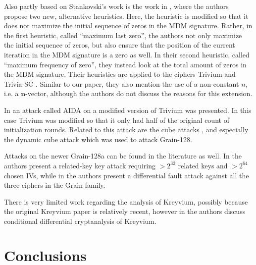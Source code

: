 { %
Also partly based on Stankovski's work is the work in \cite{sarkar:2016}, where the authors propose two new, alternative heuristics. Here, the heuristic is modified so that it does not maximize the initial sequence of zeros in the MDM signature. Rather, in the first heuristic, called ``maximum last zero'', the authors not only maximize the initial sequence of zeros, but also ensure that the position of the current iteration in the MDM signature is a zero as well. In their second heuristic, called ``maximum frequency of zero'', they instead look at the total amount of zeros in the MDM signature. Their heuristics are applied to the ciphers Trivium \cite{canniere:2006} and Trivia-SC \cite{chakraborti:2015}. Similar to our paper, they also mention the use of a non-constant $n$, i.e. a $\bm{n}$-vector, although the authors do not discuss the reasons for this extension.

In \cite{vielhaber:2007} an attack called AIDA on a modified version of Trivium was presented. In this case Trivium was modified so that it only had half of the original count of initialization rounds. Related to this attack are the 
cube attacks \cite{dinur:2009}, and especially the dynamic cube attack \cite{dinur:2011} which was used to attack Grain-128.

Attacks on the newer Grain-128a can be found in the literature as well. In \cite{banik:2013} the authors present a related-key key attack requiring $>2^{32}$ related keys and $>2^{64}$ chosen IVs, while in \cite{sarkar:2014} the authors present a differential fault attack against all the three ciphers in the Grain-family.

There is very limited work regarding the analysis of Kreyvium, possibly because the original Kreyvium paper is relatively recent, however in \cite{watanabe:2017} the authors discuss conditional differential cryptanalysis of Kreyvium.

\section{Conclusions} \label{sec:slightlygreedy:conclusions}

}
